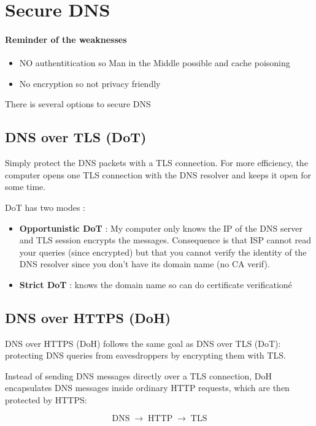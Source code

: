 \section{Secure DNS}

\paragraph{Reminder of the weaknesses}


\begin{itemize}
    \item NO authentitication so Man in the Middle possible and cache poisoning
    \item No encryption so not privacy friendly 
\end{itemize}

There is several options to secure DNS

\subsection{DNS over TLS (DoT)}
Simply protect the DNS packets with a TLS connection. For more efficiency, the computer opens one TLS connection with the DNS resolver and keeps it open for some time.

DoT has two modes : 
\begin{itemize}
    \item \textbf{Opportunistic DoT} : My computer only knows the IP of the DNS server and TLS session encrypts the messages. Consequence is that ISP cannot read your queries (since encrypted) but that you cannot verify the identity of the DNS resolver since you don't have its domain name (no CA verif).
    \item \textbf{Strict DoT} : knows the domain name so can do certificate verificationé
\end{itemize}

\subsection{DNS over HTTPS (DoH)}

DNS over HTTPS (DoH) follows the same goal as DNS over TLS (DoT): protecting DNS queries from eavesdroppers by encrypting them with TLS.

Instead of sending DNS messages directly over a TLS connection, DoH encapsulates DNS messages inside ordinary HTTP requests, which are then protected by HTTPS:

\[
\text{DNS} \;\rightarrow\; \text{HTTP} \;\rightarrow\; \text{TLS}
\]


